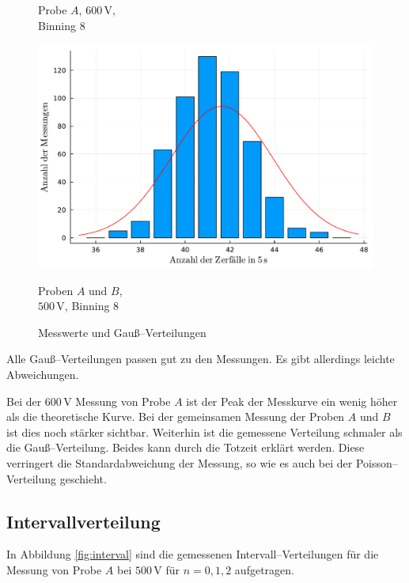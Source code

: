 \documentclass[12pt,a4paper]{scrartcl}
\numberwithin{equation}{section} %
\begin{document}
\begin{figure}[h!]
\begin{minipage}{0.3\textwidth}
		\caption*{Probe $A$, $600 \mathrm{\, V}$,\\Binning $8$}
	\end{minipage}
	\begin{minipage}{0.3\textwidth}
		\centering
		\includegraphics[width=\textwidth]{../media/B3.1/gauss3.pdf}
		\caption*{Proben $A$ und $B$,\\$500 \mathrm{\, V}$, Binning $8$}
	\end{minipage}
	\vspace{3pt}
	
	\vspace{3pt}
	
	\caption{Messwerte und Gauß--Verteilungen}
	\label{fig:gauss single}
	\vspace{12pt}
\end{figure}

\noindent
Alle Gauß--Verteilungen passen gut zu den Messungen. Es gibt allerdings leichte Abweichungen.

Bei der $600 \mathrm{\, V}$ Messung von Probe $A$ ist der Peak der Messkurve ein wenig höher als die theoretische Kurve. Bei der gemeinsamen Messung der Proben $A$ und $B$ ist dies noch stärker sichtbar. Weiterhin ist die gemessene Verteilung schmaler als die Gauß--Verteilung. Beides kann durch die Totzeit erklärt werden. Diese verringert die Standardabweichung der Messung, so wie es auch bei der Poisson--Verteilung geschieht.

\hypertarget{intervallverteilung}{%
\subsection{Intervallverteilung}\label{intervallverteilung}}
In Abbildung \ref{fig:interval} sind die gemessenen Intervall--Verteilungen für die Messung von Probe $A$ bei $500 \mathrm{\, V}$ für $n = 0,1,2$ aufgetragen.
\end{document}
